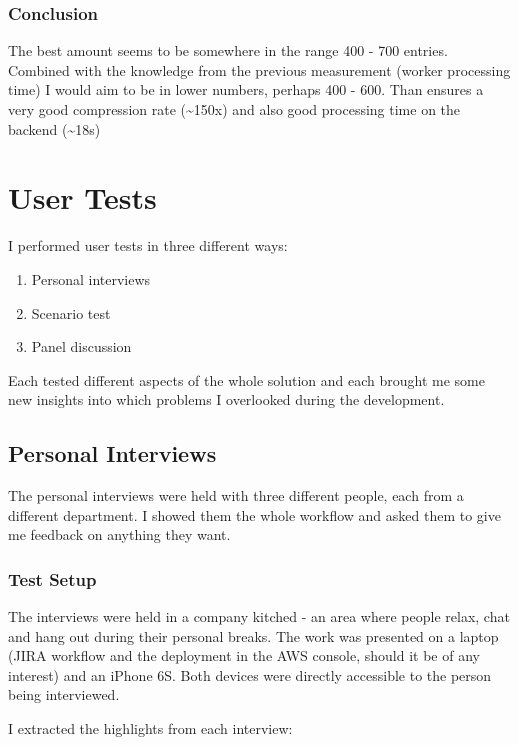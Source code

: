 \subsubsection*{Conclusion}

The best amount seems to be somewhere in the range 400 - 700 entries. Combined with the knowledge from the previous measurement (worker processing time) I would aim to be in lower numbers, perhaps 400 - 600. Than ensures a very good compression rate (\textasciitilde 150x) and also good processing time on the backend (\textasciitilde 18s)

\newpage

\section{User Tests}

I performed user tests in three different ways:

\begin{enumerate}
	\item Personal interviews
	\item Scenario test
	\item Panel discussion
\end{enumerate}

Each tested different aspects of the whole solution and each brought me some new insights into which problems I overlooked during the development.

\subsection{Personal Interviews}

The personal interviews were held with three different people, each from a different department. I showed them the whole workflow and asked them to give me feedback on anything they want.

\subsubsection{Test Setup}

The interviews were held in a company kitched - an area where people relax, chat and hang out during their personal breaks. The work was presented on a laptop (JIRA workflow and the deployment in the AWS console, should it be of any interest) and an iPhone 6S. Both devices were directly accessible to the person being interviewed.

I extracted the highlights from each interview:

